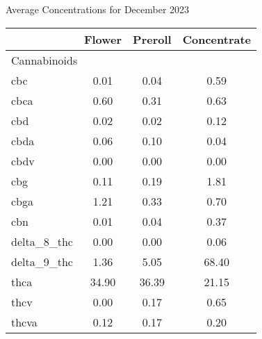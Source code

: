 \begin{table}[H]
\centering
Average Concentrations for December 2023
\begin{tabular}{lccc}
\hline\ & Flower & Preroll & Concentrate \\
\hline
\multicolumn{4}{l}{Cannabinoids} \\
\hline
cbc & 0.01 & 0.04 & 0.59 \\
cbca & 0.60 & 0.31 & 0.63 \\
cbd & 0.02 & 0.02 & 0.12 \\
cbda & 0.06 & 0.10 & 0.04 \\
cbdv & 0.00 & 0.00 & 0.00 \\
cbg & 0.11 & 0.19 & 1.81 \\
cbga & 1.21 & 0.33 & 0.70 \\
cbn & 0.01 & 0.04 & 0.37 \\
delta\_8\_thc & 0.00 & 0.00 & 0.06 \\
delta\_9\_thc & 1.36 & 5.05 & 68.40 \\
thca & 34.90 & 36.39 & 21.15 \\
thcv & 0.00 & 0.17 & 0.65 \\
thcva & 0.12 & 0.17 & 0.20 \\
\hline
\end{tabular}
\end{table}
